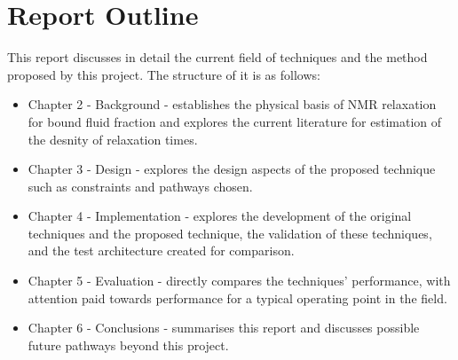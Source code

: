 \section{Report Outline}
This report discusses in detail the current field of techniques and the method proposed by this project. The structure of it is as follows:

\begin{itemize}
    \item Chapter 2 - Background - establishes the physical basis of NMR relaxation for bound fluid fraction and explores the current literature for estimation of the desnity of relaxation times.
    
    \item Chapter 3 - Design - explores the design aspects of the proposed technique such as constraints and pathways chosen.
    
    \item Chapter 4 - Implementation - explores the development of the original techniques and the proposed technique, the validation of these techniques, and the test architecture created for comparison.
    
    \item Chapter 5 - Evaluation - directly compares the techniques' performance, with attention paid towards performance for a typical operating point in the field.
    
    \item Chapter 6 - Conclusions - summarises this report and discusses possible future pathways beyond this project.
    
    
\end{itemize}
